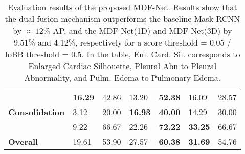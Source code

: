 \begin{table}[h!]
{\begin{tabular}{l|ll|ll|ll|}
\rowcolor[HTML]{D4E6F1} 
\multicolumn{1}{|l|}{\cellcolor[HTML]{D4E6F1}\textbf{Pleural Abn.}}                  & \multicolumn{1}{l|}{\cellcolor[HTML]{D4E6F1}\textbf{16.29}}                     & 42.86                                                                           & \multicolumn{1}{l|}{\cellcolor[HTML]{D4E6F1}13.20}                              & \textbf{52.38}                                                                  & \multicolumn{1}{l|}{\cellcolor[HTML]{D4E6F1}16.09}                              & 28.57                                                                           \\
\multicolumn{1}{|l|}{\textbf{Consolidation}}                                         & \multicolumn{1}{l|}{3.12}                                                       & 20.00                                                                           & \multicolumn{1}{l|}{\textbf{16.93}}                                             & \textbf{40.00}                                                                  & \multicolumn{1}{l|}{14.29}                                                      & 30.00                                                                           \\
\rowcolor[HTML]{D4E6F1} 
\multicolumn{1}{|l|}{\cellcolor[HTML]{D4E6F1}\textbf{Pulm. Edema}}                   & \multicolumn{1}{l|}{\cellcolor[HTML]{D4E6F1}9.22}                               & 66.67                                                                           & \multicolumn{1}{l|}{\cellcolor[HTML]{D4E6F1}22.26}                              & \textbf{72.22}                                                                  & \multicolumn{1}{l|}{\cellcolor[HTML]{D4E6F1}\textbf{33.25}}                     & 66.67                                                                           \\ \hline
\multicolumn{1}{|l|}{\textbf{Overall}}                                               & \multicolumn{1}{l|}{19.61}                                                      & 53.90                                                                           & \multicolumn{1}{l|}{27.57}                                                      & \textbf{60.38}                                                                  & \multicolumn{1}{l|}{\textbf{31.69}}                                             & 54.76                                                                           \\ \hline
\end{tabular}
}
\caption{Evaluation results of the proposed MDF-Net. Results show that the dual fusion mechanism outperforms the baseline Mask-RCNN by $\approx 12\%$ AP, and the MDF-Net(1D) and MDF-Net(3D) by 9.51\% and 4.12\%, respectively for a score threshold = 0.05 / IoBB threshold = 0.5. In the table, Enl. Card. Sil. corresponds to Enlarged Cardiac Silhouette, Pleural Abn to Pleural Abnormality, and Pulm. Edema to Pulmonary Edema. }
\label{tab:res}
\end{table}